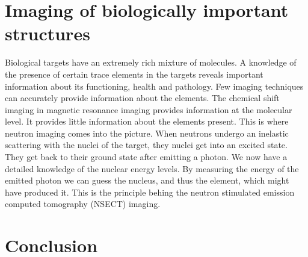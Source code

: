 \documentclass{article}
\numberwithin{equation}{section}
\begin{document}
\section{Imaging of biologically important structures}\label{s13}
Biological targets have an extremely rich mixture of molecules. A knowledge of
the presence of certain trace elements in the targets reveals important 
information about its functioning, health and pathology. Few imaging techniques
can accurately provide information about the elements. The chemical shift 
imaging in magnetic resonance imaging provides information at the molecular
level. It provides little information about the elements present. This is where
neutron imaging comes into the picture. When neutrons undergo an inelastic
scattering with the nuclei of the target, they nuclei get into an excited
state. They get back to their ground state after emitting a photon. We now 
have a detailed knowledge of the nuclear energy levels. By measuring the energy
of the emitted photon we can guess the nucleus, and thus the element, which
might have produced it. This is the principle behing the neutron stimulated
emission computed tomography (NSECT) imaging.
\section{Conclusion}\label{s14}


\end{document}
